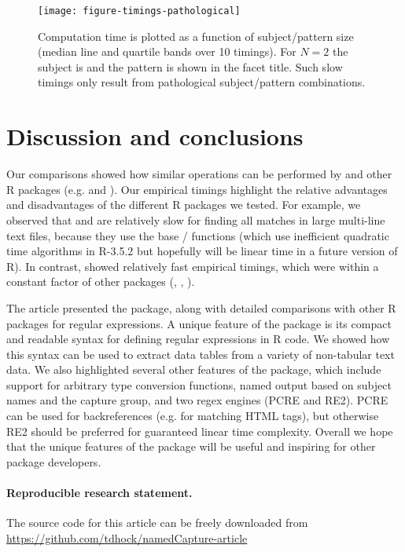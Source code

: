\begin{figure}
  \texttt{[image: figure-timings-pathological]}
  \vskip -0.5cm
  \caption{\label{fig:timings-pathological} Computation time is
    plotted as a function of subject/pattern size (median line and
    quartile bands over 10 timings). For $N=2$ the subject is 
    and the pattern is shown in the facet title. Such slow timings
    only result from pathological subject/pattern combinations.}
\end{figure}

\section{Discussion and conclusions}

Our comparisons showed how similar operations can be performed by  and
other R packages (e.g.  and ). Our
empirical timings highlight the relative advantages and disadvantages
of the different R packages we tested. For example, we observed that
 and  are relatively slow for finding
all matches in large multi-line text files, because they use the base
/ functions (which use inefficient
quadratic time algorithms in R-3.5.2 but hopefully will be linear time
in a future version of R). In contrast,  showed
relatively fast empirical timings, which were within a constant factor
of other packages (, ,
). 

The article presented the  package, along with
detailed comparisons with other R packages for regular expressions.  A
unique feature of the  package is its compact and
readable syntax for defining regular expressions in R code. We showed
how this syntax can be used to extract data tables from a variety of
non-tabular text data. We also highlighted several other features of
the  package, which include support for 
arbitrary type conversion functions, named output based on subject names and the
 capture group, and two regex engines (PCRE and RE2). PCRE
can be used for backreferences (e.g. for matching HTML tags), but
otherwise RE2 should be preferred for guaranteed linear time
complexity.
Overall we hope that the unique features of the 
package will be useful and inspiring for other package developers.  


\paragraph{Reproducible research statement.} The source code for this
article can be freely downloaded from
\url{https://github.com/tdhock/namedCapture-article}



\address{Toby Dylan Hocking\\
  School of Informatics, Computing, and Cyber Systems\\
  Northern Arizona University\\
  Flagstaff, Arizona\\
  USA\\
  }
